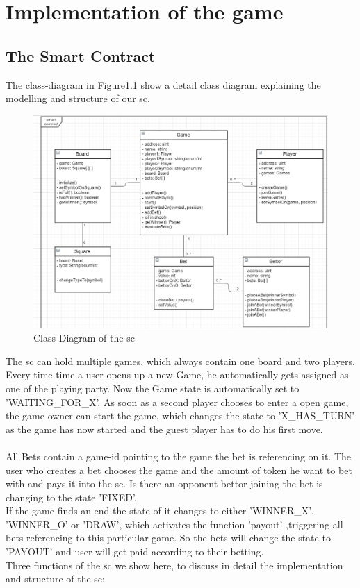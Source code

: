 \chapter{Implementation of the game}\label{ch:implementation}
\section{The Smart Contract}
The class-diagram in Figure\ref{fig:sc_uml}  show a detail class diagram explaining the modelling and structure of our \ac{sc}. \\
\begin{figure}[ht]
	\begin{center}
		\includegraphics[scale=0.22]{res/sc_uml}
	\end{center}
	\caption{Class-Diagram of the \ac{sc}}
	\label{fig:sc_uml}
\end{figure}
The \ac{sc} can hold multiple games, which always contain one board and two players. Every time time a user opens up a new Game, he automatically gets assigned as one of the playing party. Now the Game state is automatically set to 'WAITING\_FOR\_X'. As soon as a second player chooses to enter a open game, the game owner can start the game, which changes the state to 'X\_HAS\_TURN' as the game has now started and the guest player has to do his first move.\\\\
All Bets contain a game-id pointing to the game the bet is referencing on it. The user who creates a bet chooses the game and the amount of token he want to bet with and pays it into the \ac{sc}. Is there an opponent bettor joining the bet is changing to the state 'FIXED'.\\
If the game finds an end the state of it changes to either 'WINNER\_X', 'WINNER\_O' or 'DRAW', which activates the function 'payout' ,triggering all bets referencing to this particular game. So the bets will change the state to 'PAYOUT' and user will get paid according to their betting.\\ 
Three functions of the \ac{sc} we show here, to discuss in detail the implementation and structure of the \ac{sc}:\\





